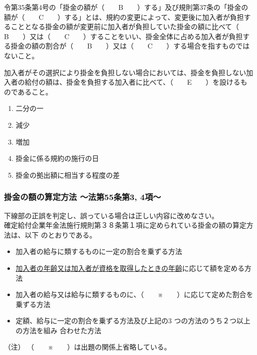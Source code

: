\begin{fillblank}[自作 2026/11/7]
\begin{lawstructure}
\begin{lawarticle}{}{}
      令第35条第4号の「掛金の額が（　　B　　）する」及び規則第37条の「掛金の額が（　　C　　）する」とは、規約の変更によって、変更後に加入者が負担することとなる掛金の額が変更前に加入者が負担していた掛金の額に比べて（　　B　　）又は（　　C　　）することをいい、掛金全体に占める加入者が負担する掛金の額の割合が（　　B　　）又は（　　C　　）する場合を指すものではないこと。

      加入者がその選択により掛金を負担しない場合においては、掛金を負担しない加入者の給付の額は、掛金を負担する加入者に比べて、（　　E　　）を設けるものであること。


    \end{lawarticle}
  \end{lawstructure}
\end{fillblank}

\begin{answerbox}
  \begin{enumerate}[A: ]
    \item 二分の一
    \item 減少
    \item 増加
    \item 掛金に係る規約の施行の日
    \item 掛金の拠出額に相当する程度の差
  \end{enumerate}
\end{answerbox}

\newpage

\subsubsection{掛金の額の算定方法 〜法第55条第3, 4項〜}

\begin{truefalse}[年金1 2023 問題1(3)イ]
  下線部の正誤を判定し、誤っている場合は正しい内容に改めなさい。
\\

  確定給付企業年金法施行規則第３８条第１項に定められている掛金の額の算定方法は、以下
のとおりである。

\begin{itemize}
  \item 加入者の給与に類するものに一定の割合を乗ずる方法
  \item \underline{加入者の年齢又は加入者が資格を取得したときの年齢}に応じて額を定める方法
  \item 加入者の給与又は給与に類するものに、（　　※　　）に応じて定めた割合を乗ずる方法
  \item 定額、給与に一定の割合を乗ずる方法及び上記の3 つの方法のうち２つ以上の方法を組み
合わせた方法
\end{itemize}

（注） （　　※　　）は出題の関係上省略している。
\end{truefalse}

